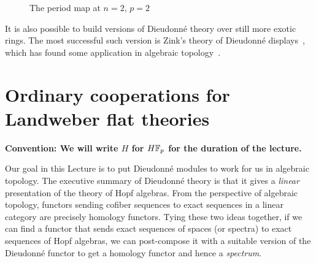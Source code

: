 \begin{figure}
\begin{center}
\end{center}
\caption{The period map at \(n = 2\), \(p = 2\)}\label{PeriodMapFigure}
\end{figure}

\begin{remark}
It is also possible to build versions of Dieudonn\'e theory over still more exotic rings.  The most successful such version is Zink's theory of Dieudonn\'e displays~\cite{ZinkDisplays}, which has found some application in algebraic topology~\cite{LawsonDisplays}.
\end{remark}









\section{Ordinary cooperations for Landweber flat theories}\label{LEFTCooperations}

\begin{center}
\textbf{Convention: We will write \(H\) for \(\HFp\) for the duration of the lecture.}
\end{center}

Our goal in this Lecture is to put Dieudonn\'e modules to work for us in algebraic topology.  The executive summary of Dieudonn\'e theory is that it gives a \emph{linear} presentation of the theory of Hopf algebras.  From the perspective of algebraic topology, functors sending cofiber sequences to exact sequences in a linear category are precisely homology functors.  Tying these two ideas together, if we can find a functor that sends exact sequences of spaces (or spectra) to exact sequences of Hopf algebras, we can post-compose it with a suitable version of the Dieudonn\'e functor to get a homology functor and hence a \emph{spectrum}.

